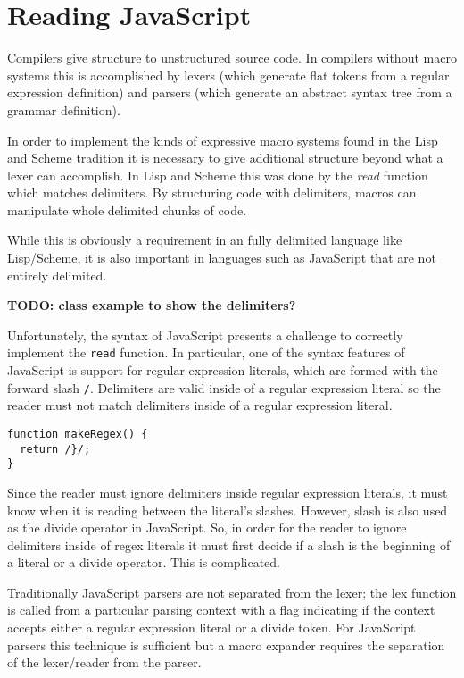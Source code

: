 \documentclass[onecolumn]{sigplanconf-onecolumn}
\begin{document}
\section{Reading JavaScript}
\label{sec:read}

Compilers give structure to unstructured source code. In compilers without macro systems this is accomplished by lexers (which generate flat tokens from a regular expression definition) and parsers (which generate an abstract syntax tree from a grammar definition).

In order to implement the kinds of expressive macro systems found in the Lisp and Scheme tradition it is necessary to give additional structure beyond what a lexer can accomplish. In Lisp and Scheme this was done by the \emph{read} function which matches delimiters. By structuring code with delimiters, macros can manipulate whole delimited chunks of code.

While this is obviously a requirement in an fully delimited language like Lisp/Scheme, it is also important in languages such as JavaScript that are not entirely delimited.

\textbf{TODO: class example to show the delimiters?}

Unfortunately, the syntax of JavaScript presents a challenge to correctly implement the \texttt{read} function. In particular, one of the syntax features of JavaScript is support for regular expression literals, which are formed with the forward slash \lstinline!/!. Delimiters are valid inside of a regular expression literal so the reader must not match delimiters inside of a regular expression literal.

\begin{lstlisting}
function makeRegex() {
  return /}/;
}
\end{lstlisting}

Since the reader must ignore delimiters inside regular expression literals, it must know when it is reading between the literal's slashes. However, slash is also used as the divide operator in JavaScript. So, in order for the reader to ignore delimiters inside of regex literals it must first decide if a slash is the beginning of a literal or a divide operator. This is complicated.

Traditionally JavaScript parsers are not separated from the lexer; the lex function is called from a particular parsing context with a flag indicating if the context accepts either a regular expression literal or a divide token. For JavaScript parsers this technique is sufficient but a macro expander requires the separation of the lexer/reader from the parser.
\end{document}
